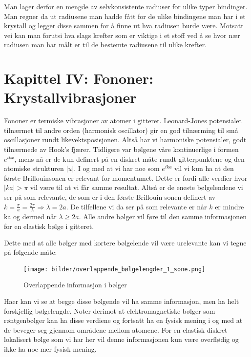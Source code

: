 \documentclass{article}
\begin{document}
Man lager derfor en mengde av selvkonsistente radiuser for ulike typer bindinger. Man regner da ut radiusene man hadde fått for de ulike bindingene man har i et krystall og legger disse sammen for å finne ut hva radiusen burde være. Motsatt vei kan man forutsi hva slags krefter som er viktige i et stoff ved å se hvor nær radiusen man har målt er til de bestemte radiusene til ulike krefter.
\newpage
\section{Kapittel IV: Fononer: Krystallvibrasjoner}
Fononer er termiske vibrasjoner av atomer i gitteret. Leonard-Jones potensialet tilnærmet til andre orden (harmonisk oscillator) gir en god tilnærming til små oscillasjoner rundt likevektsposisjonen. Altså har vi harmoniske potensialer, godt tilnærmede av Hook's fjærer. Tidligere var bølgene våre kontinuerlige i formen $e^{ikx}$, mens nå er de kun definert på en diskret måte rundt gitterpunktene og den atomiske strukturen $|u|$. I og med at vi har noe som $e^{ika}$ vil vi kun ha at den første Brillouinsonen er relevant for momentumet. Dette er fordi alle verdier hvor $|ka| > \pi$ vil være til at vi får samme resultat. Altså er de eneste bølgelendene vi ser på som relevante, de som er i den første Brillouin-sonen definert av $k = \frac{\pi}{a} = \frac{2\pi}{\lambda} \Rightarrow \lambda = 2a$. De tilfellene vi da ser på som relevante er når $k$ er mindre ka og dermed når $\lambda \geq 2a$. Alle andre bølger vil føre til den samme informasjonen for en elastisk bølge i gitteret.

Dette med at alle bølger med kortere bølgelende vil være urelevante kan vi tegne på følgende måte:
\begin{figure}[H]
    \centering
    \texttt{[image: bilder/overlappende\_bølgelengder\_1\_sone.png]}
    \caption{Overlappende informasjon i bølger}
    \label{fig:overlappende_bølgelengder_1_sone}
\end{figure}
Haer kan vi se at begge disse bølgende vil ha samme informasjon, men ha helt forskjellig bølgelengde. Noter derimot at elektromagnetiske bølger som røntgenbølger kan ha disse verdiene og fortsatt ha en fysisk mening i og med at de beveger seg gjennom områdene mellom atomene. For en elastisk diskret lokalisert bølge som vi har her vil denne informasjonen kun være overflødig og ikke ha noe mer fysisk mening.
\end{document}
